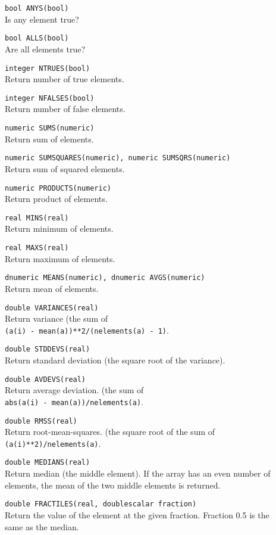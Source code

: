 \begin{description}
  \item[] \texttt{bool ANYS(bool)}\\
    Is any element true?
  \item[] \texttt{bool ALLS(bool)}\\
    Are all elements true?
  \item[] \texttt{integer NTRUES(bool)}\\
    Return number of true elements.
  \item[] \texttt{integer NFALSES(bool)}\\
    Return number of false elements.
  \item[] \texttt{numeric SUMS(numeric)}\\
    Return sum of elements.
  \item[] \texttt{numeric SUMSQUARES(numeric), numeric SUMSQRS(numeric)}\\
    Return sum of squared elements.
  \item[] \texttt{numeric PRODUCTS(numeric)}\\
    Return product of elements.
  \item[] \texttt{real MINS(real)}\\
    Return minimum of elements.
  \item[] \texttt{real MAXS(real)}\\
    Return maximum of elements.
  \item[] \texttt{dnumeric MEANS(numeric), dnumeric AVGS(numeric)}\\
    Return mean of elements.
  \item[] \texttt{double VARIANCES(real)}\\
    Return variance (the sum of
    \\\texttt{(a(i) - mean(a))**2/(nelements(a) - 1)}.
  \item[] \texttt{double STDDEVS(real)}\\
    Return standard deviation (the square root of the variance).
  \item[] \texttt{double AVDEVS(real)}\\
    Return average deviation. (the sum of 
    \\\texttt{abs(a(i) - mean(a))/nelements(a)}.
  \item[] \texttt{double RMSS(real)}\\
    Return root-mean-squares. (the square root of the sum of
    \\\texttt{(a(i)**2)/nelements(a)}.
  \item[] \texttt{double MEDIANS(real)}\\
    Return median (the middle element).
    If the array has an even number of elements, the mean of
    the two middle elements is returned.
  \item[] \texttt{double FRACTILES(real, doublescalar fraction)}\\
    Return the value of the element at the given fraction.
    Fraction 0.5 is the same as the median.
\end{description}

